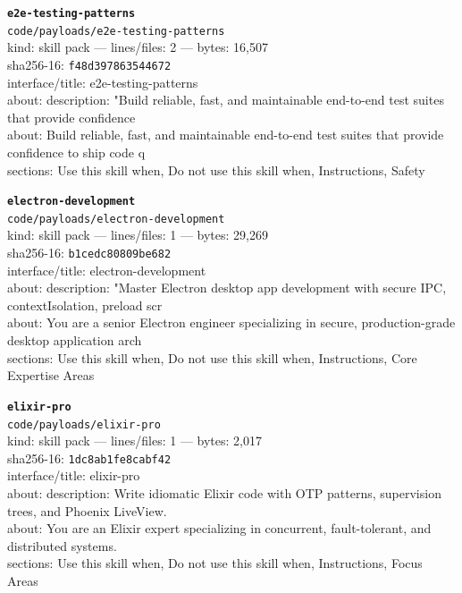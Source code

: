 \noindent\textbf{\texttt{e2e-testing-patterns}}\\
\texttt{code/payloads/e2e-testing-patterns}\\
kind: skill pack --- lines/files: 2 --- bytes: 16,507\\
sha256-16: \texttt{f48d397863544672}\\
interface/title: e2e-testing-patterns\\
about: description: "Build reliable, fast, and maintainable end-to-end test suites that provide confidence \\
about: Build reliable, fast, and maintainable end-to-end test suites that provide confidence to ship code q\\
sections: Use this skill when, Do not use this skill when, Instructions, Safety\\
\vspace*{6.0pt}

\noindent\textbf{\texttt{electron-development}}\\
\texttt{code/payloads/electron-development}\\
kind: skill pack --- lines/files: 1 --- bytes: 29,269\\
sha256-16: \texttt{b1cedc80809be682}\\
interface/title: electron-development\\
about: description: "Master Electron desktop app development with secure IPC, contextIsolation, preload scr\\
about: You are a senior Electron engineer specializing in secure, production-grade desktop application arch\\
sections: Use this skill when, Do not use this skill when, Instructions, Core Expertise Areas\\
\vspace*{6.0pt}

\noindent\textbf{\texttt{elixir-pro}}\\
\texttt{code/payloads/elixir-pro}\\
kind: skill pack --- lines/files: 1 --- bytes: 2,017\\
sha256-16: \texttt{1dc8ab1fe8cabf42}\\
interface/title: elixir-pro\\
about: description: Write idiomatic Elixir code with OTP patterns, supervision trees, and Phoenix LiveView.\\
about: You are an Elixir expert specializing in concurrent, fault-tolerant, and distributed systems.\\
sections: Use this skill when, Do not use this skill when, Instructions, Focus Areas\\
\vspace*{6.0pt}

